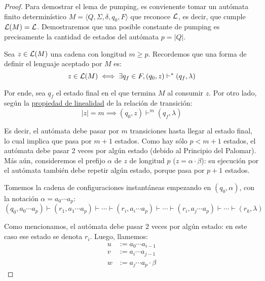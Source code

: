 \begin{proof}
    Para demostrar el lema de pumping, es convienente tomar un autómata finito determinístico $M = \langle Q, \Sigma, \delta, q_0, F \rangle$ que reconoce $\mathcal{L}$, es decir, que cumple $\mathcal{L}(M) = \mathcal{L}$. Demostraremos que una posible constante de pumping es precisamente la cantidad de estados del autómata $p = |Q|$.

    Sea $z \in \mathcal{L}(M)$ una cadena con longitud $m \geq p$. Recordemos que una forma de definir el lenguaje aceptado por $M$ es:
    $$
        z \in \mathcal{L}(M) \iff \exists q_f \in F, (q_0, z) \vdash^* (q_f, \lambda)
    $$

    Por ende, sea $q_f$ el estado final en el que termina $M$ al consumir $z$. Por otro lado, según la \hyperref[subsubsec-propiedades-rel-transicion]{propiedad de linealidad} de la relación de transición:
    $$
        |z| = m \implies (q_0, z) \vdash^m (q_f, \lambda)
    $$

    Es decir, el autómata debe pasar por $m$ transiciones hasta llegar al estado final, lo cual implica que pasa por $m + 1$ estados. Como hay sólo $p < m + 1$ estados, el autómata debe pasar 2 veces por algún estado (debido al Principio del Palomar). Más aún, consideremos el prefijo $\alpha$ de $z$ de longitud $p$ ($z = \alpha \cdot \beta$): su ejecución por el autómata también debe repetir algún estado, porque pasa por $p + 1$ estados.

    Tomemos la cadena de configuraciones instantáneas empezando en $(q_0, \alpha)$, con la notación $\alpha = a_0 \cdots a_p$:
    $$
        (q_0, a_0 \cdots a_p) \vdash (r_1, a_1 \cdots a_p) \vdash \cdots \vdash (r_i, a_i \cdots a_p) \vdash \cdots \vdash (r_i, a_j \cdots a_p) \vdash \cdots \vdash (r_k, \lambda)
    $$

    Como mencionamos, el autómata debe pasar 2 veces por algún estado: en este caso ese estado se denota $r_i$. Luego, llamemos:
    $$
        \begin{aligned}
            u & := a_0 \cdots a_{i - 1}       \\
            v & := a_i \cdots a_{j - 1}       \\
            w & := a_j \cdots a_p \cdot \beta
        \end{aligned}
    $$


\end{proof}
